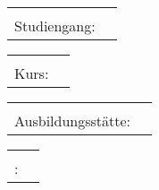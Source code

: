 \begin{tabular}{rl}
	\hspace{0.45\textwidth} &                       \\
	Studiengang: & \CSTUDIENGANG
\end{tabular}

\begin{tabular}{rl}
	\hspace{0.45\textwidth} &       \\
			Kurs: & \CKURS
\end{tabular}

\begin{tabular}{rl}
	\hspace{0.45\textwidth} &          \\
	Ausbildungsstätte: & \CBETRIEB
\end{tabular}

\begin{tabular}{rl}
	\hspace{0.45\textwidth} &          \\
	\BETREUER: & \CBETREUER
\end{tabular}

\vspace*{\fill}

\pagebreak

